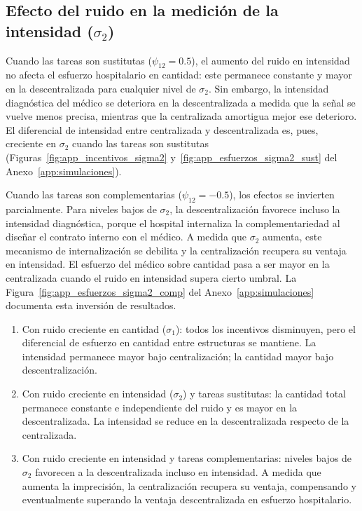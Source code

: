 \subsection{Efecto del ruido en la medición de la intensidad (\texorpdfstring{$\sigma_2$}{sigma\_2})}

Cuando las tareas son sustitutas ($\psi_{12}=0.5$), el aumento del ruido en intensidad no afecta el esfuerzo hospitalario en cantidad: este permanece constante y mayor en la descentralizada para cualquier nivel de $\sigma_2$. Sin embargo, la intensidad diagnóstica del médico se deteriora en la descentralizada a medida que la señal se vuelve menos precisa, mientras que la centralizada amortigua mejor ese deterioro. El diferencial de intensidad entre centralizada y descentralizada es, pues, creciente en $\sigma_2$ cuando las tareas son sustitutas (Figuras~\ref{fig:app_incentivos_sigma2} y~\ref{fig:app_esfuerzos_sigma2_sust} del Anexo~\ref{app:simulaciones}).

Cuando las tareas son complementarias ($\psi_{12}=-0.5$), los efectos se invierten parcialmente. Para niveles bajos de $\sigma_2$, la descentralización favorece incluso la intensidad diagnóstica, porque el hospital internaliza la complementariedad al diseñar el contrato interno con el médico. A medida que $\sigma_2$ aumenta, este mecanismo de internalización se debilita y la centralización recupera su ventaja en intensidad. El esfuerzo del médico sobre cantidad pasa a ser mayor en la centralizada cuando el ruido en intensidad supera cierto umbral. La Figura~\ref{fig:app_esfuerzos_sigma2_comp} del Anexo~\ref{app:simulaciones} documenta esta inversión de resultados.

\begin{result}
\label{res:ruido}
\begin{enumerate}[label=(\alph*)]
  \item Con ruido creciente en cantidad ($\sigma_1$): todos los incentivos disminuyen, pero el diferencial de esfuerzo en cantidad entre estructuras se mantiene. La intensidad permanece mayor bajo centralización; la cantidad mayor bajo descentralización.
  \item Con ruido creciente en intensidad ($\sigma_2$) y tareas sustitutas: la cantidad total permanece constante e independiente del ruido y es mayor en la descentralizada. La intensidad se reduce en la descentralizada respecto de la centralizada.
  \item Con ruido creciente en intensidad y tareas complementarias: niveles bajos de $\sigma_2$ favorecen a la descentralizada incluso en intensidad. A medida que aumenta la imprecisión, la centralización recupera su ventaja, compensando y eventualmente superando la ventaja descentralizada en esfuerzo hospitalario.
\end{enumerate}
\end{result}


